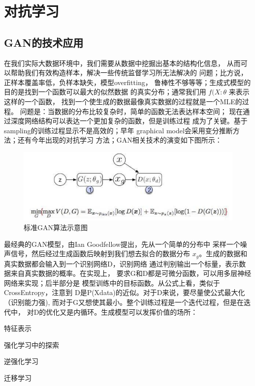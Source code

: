
\chapter{对抗学习}
\thispagestyle{empty}

\setlength{\fboxrule}{0pt}\setlength{\fboxsep}{0cm}
\noindent\shadowbox{
\begin{tcolorbox}[arc=0mm,colback=lightblue,colframe=darkblue,title=学习目标与要求]

\end{tcolorbox}}
\setlength{\fboxrule}{1pt}\setlength{\fboxsep}{4pt} 


\section{GAN的技术应用} 

在我们实际大数据环境中，我们需要从数据中挖掘出基本的结构化信息，
从而可以帮助我们有效构造样本，解决一些传统监督学习所无法解决的
问题；比方说，正样本覆盖率低，负样本缺失，模型overfitting，
鲁棒性不够等等；生成式模型的目的是找到一个函数可以最大的似然数据
的真实分布；通常我们用 $f(X:\theta$ 来表示这样的一个函数，
找到一个使生成的数据最像真实数据的过程就是一个MLE的过程。
问题是：当数据的分布比较复杂时，简单的函数无法表达样本空间；
现在通过深度网络结构可以表达一个更加复杂的函数，但是训练过程
成为了关键。基于sampling的训练过程显示不是高效的；早年
graphical model会采用变分推断方法；还有今年出现的对抗学习
方法；GAN相关技术的演变如下图所示：


\begin{figure}[h]
\centering
\includegraphics[totalheight=1.8in]{fig/standard_gan.png}
\caption{ 标准GAN算法示意图 } \label{fig:gansamples}
\end{figure}

最经典的GAN模型，由Ian Goodfellow提出，先从一个简单的分布中
采样一个噪声信号，然后经过生成函数后映射到我们想去拟合的数据分布
$x_g$。生成的数据和真实数据都会输入到一个识别网络D，识别网络
通过判别输出一个标量，表示数据来自真实数据的概率。在实现上，
要求G和D都是可微分函数，可以用多层神经网络来实现；后半部分是
模型训练中的目标函数。从公式上看，类似于CrossEntropy，注意到
D是P(Xdata)的近似。对于D来说，要尽量使公式最大化（识别能力强), 
而对于G又想使其最小。整个训练过程是一个迭代过程，但是在迭代中，
对D的优化又是内循环。生成模型可以发挥价值的场所： 
\begin{description}
	\item 特征表示
	\item 强化学习中的探索
	\item 逆强化学习
	\item 迁移学习
\end{description}



